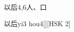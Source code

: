 \begin{entry}{以后}{4,6}{⼈、⼝}
  \begin{phonetics}{以后}{yi3 hou4}[][HSK 2]
  \end{phonetics}
\end{entry}
